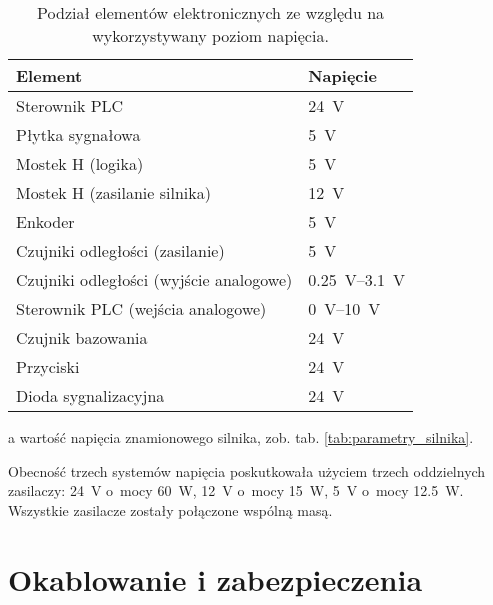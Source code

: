 \begin{table}[h]
    \centering
    \begin{threeparttable}
        \caption{Podział elementów elektronicznych ze względu na wykorzystywany poziom napięcia.}
        \label{tab:poziomy_napiec}
        
        \begin{tabularx}{0.6\textwidth}{l | l}
            \toprule
            Element & Napięcie \\
            \midrule
            Sterownik PLC & \SI{24}{\volt} \\
            Płytka sygnałowa & \SI{5}{\volt} \\
            Mostek H (logika) & \SI{5}{\volt} \\
            Mostek H (zasilanie silnika)\tnote[a] & \SI{12}{\volt} \\
            Enkoder & \SI{5}{\volt} \\
            Czujniki odległości (zasilanie) & \SI{5}{\volt} \\
            Czujniki odległości (wyjście analogowe) & \SIrange{0,25}{3,1}{\volt} \\
            Sterownik PLC (wejścia analogowe) & \SIrange{0}{10}{\volt} \\
            Czujnik bazowania & \SI{24}{\volt} \\
            Przyciski & \SI{24}{\volt} \\
            Dioda sygnalizacyjna & \SI{24}{\volt} \\
            \bottomrule
        \end{tabularx}
        
        \begin{tablenotes}
            \footnotesize
            \item[a] wartość napięcia znamionowego silnika, zob. tab. \ref{tab:parametry_silnika}.
        \end{tablenotes}
    \end{threeparttable}
\end{table}

Obecność trzech systemów napięcia poskutkowała użyciem trzech oddzielnych zasilaczy: \SI{24}{\volt} o~mocy \SI{60}{\watt}, \SI{12}{\volt} o~mocy \SI{15}{\watt}, \SI{5}{\volt} o~mocy \SI{12,5}{\watt}. Wszystkie zasilacze zostały połączone wspólną masą.

\section{Okablowanie i zabezpieczenia}
\label{sec:ch3_okablowanie_zabezpieczenia}

